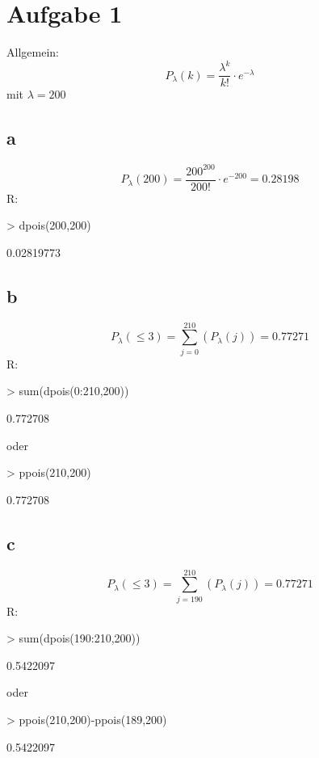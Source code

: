 

\section{Aufgabe 1}
Allgemein: 
\[ P_{\lambda}(k) = \frac{\lambda^k}{k!} \cdot e^{-\lambda} \]
mit $\lambda = 200$

\subsection{a}
\[ P_{\lambda}(200) = \frac{200^200}{200!} \cdot e^{-200} = 0.28198 \]
R:
\begin{Schunk}
\begin{Sinput}
> dpois(200,200)
\end{Sinput}
\begin{Soutput}
[1] 0.02819773
\end{Soutput}
\end{Schunk}

\subsection{b}
\[ P_{\lambda}(\leq3) = \sum_{j=0}^{210}(P_{\lambda}(j)) = 0.77271 \]
R:
\begin{Schunk}
\begin{Sinput}
> sum(dpois(0:210,200))
\end{Sinput}
\begin{Soutput}
[1] 0.772708
\end{Soutput}
\end{Schunk}
oder
\begin{Schunk}
\begin{Sinput}
> ppois(210,200)
\end{Sinput}
\begin{Soutput}
[1] 0.772708
\end{Soutput}
\end{Schunk}

\subsection{c}
\[ P_{\lambda}(\leq3) = \sum_{j=190}^{210}(P_{\lambda}(j)) = 0.77271 \]
R:
\begin{Schunk}
\begin{Sinput}
> sum(dpois(190:210,200))
\end{Sinput}
\begin{Soutput}
[1] 0.5422097
\end{Soutput}
\end{Schunk}
oder
\begin{Schunk}
\begin{Sinput}
> ppois(210,200)-ppois(189,200)
\end{Sinput}
\begin{Soutput}
[1] 0.5422097
\end{Soutput}
\end{Schunk}
